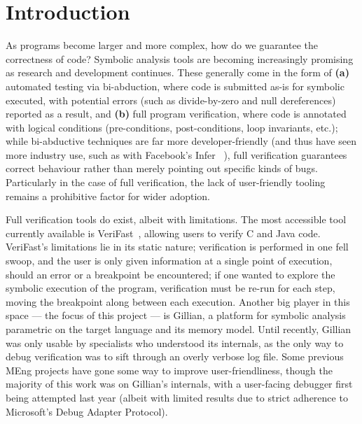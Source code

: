 
\chapter{Introduction}\label{sec:intro}

As programs become larger and more complex, how do we guarantee the correctness
of code? Symbolic analysis tools are becoming increasingly promising as research
and development continues. These generally come in the form of {\bf (a)}
automated testing via bi-abduction, where code is submitted as-is for symbolic
executed, with potential errors (such as divide-by-zero and null dereferences)
reported as a result, and {\bf (b)} full program verification, where code is
annotated with logical conditions (pre-conditions, post-conditions, loop
invariants, etc.); while bi-abductive techniques are far more developer-friendly
(and thus have seen more industry use, such as with Facebook's Infer
~\cite{infer}), full verification guarantees correct behaviour rather than
merely pointing out specific kinds of bugs. Particularly in the case of full
verification, the lack of user-friendly tooling remains a prohibitive factor for
wider adoption.

Full verification tools do exist, albeit with limitations. The most accessible
tool currently available is VeriFast~\cite{verifast-paper, verifast-repo},
allowing users to verify C and Java code. VeriFast's limitations lie in its
static nature; verification is performed in one fell swoop, and the user is
only given information at a single point of execution, should an error or a
breakpoint be encountered; if one wanted to explore the symbolic execution
of the program, verification must be re-run for each step, moving the breakpoint
along between each execution. Another big player in this space --- the focus of
this project --- is Gillian, a platform for symbolic analysis parametric on the
target language and its memory model. Until recently, Gillian was only usable
by specialists who understood its internals, as the only way to debug
verification was to sift through an overly verbose log file. Some previous MEng
projects have gone some way to improve user-friendliness, though the majority of
this work was on Gillian's internals, with a user-facing debugger first being
attempted last year (albeit with limited results due to strict adherence to
Microsoft's Debug Adapter Protocol).

